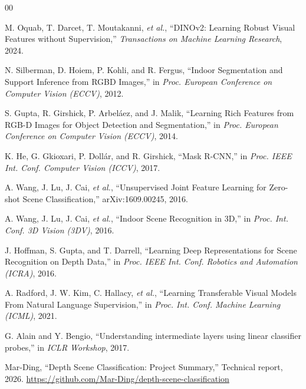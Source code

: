\documentclass[conference, a4paper]{IEEEtran}
\begin{document}
\begin{thebibliography}{00}

M. Oquab, T. Darcet, T. Moutakanni, \textit{et al.},
``DINOv2: Learning Robust Visual Features without Supervision,''
\textit{Transactions on Machine Learning Research}, 2024.

N. Silberman, D. Hoiem, P. Kohli, and R. Fergus,
``Indoor Segmentation and Support Inference from RGBD Images,''
in \textit{Proc. European Conference on Computer Vision (ECCV)}, 2012.

S. Gupta, R. Girshick, P. Arbel{\'a}ez, and J. Malik,
``Learning Rich Features from RGB-D Images for Object Detection and Segmentation,''
in \textit{Proc. European Conference on Computer Vision (ECCV)}, 2014.

K. He, G. Gkioxari, P. Doll{\'a}r, and R. Girshick,
``Mask R-CNN,''
in \textit{Proc. IEEE Int. Conf. Computer Vision (ICCV)}, 2017.

A. Wang, J. Lu, J. Cai, \textit{et al.},
``Unsupervised Joint Feature Learning for Zero-shot Scene Classification,''
arXiv:1609.00245, 2016.

A. Wang, J. Lu, J. Cai, \textit{et al.},
``Indoor Scene Recognition in 3D,''
in \textit{Proc. Int. Conf. 3D Vision (3DV)}, 2016.

J. Hoffman, S. Gupta, and T. Darrell,
``Learning Deep Representations for Scene Recognition on Depth Data,''
in \textit{Proc. IEEE Int. Conf. Robotics and Automation (ICRA)}, 2016.

A. Radford, J. W. Kim, C. Hallacy, \textit{et al.},
``Learning Transferable Visual Models From Natural Language Supervision,''
in \textit{Proc. Int. Conf. Machine Learning (ICML)}, 2021.

G. Alain and Y. Bengio,
``Understanding intermediate layers using linear classifier probes,''
in \textit{ICLR Workshop}, 2017.

Mar-Ding,
``Depth Scene Classification: Project Summary,''
Technical report, 2026.
\url{https://github.com/Mar-Ding/depth-scene-classification}

\end{thebibliography}
\end{document}
